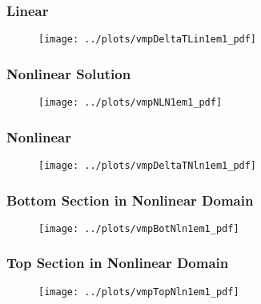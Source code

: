 \documentclass[compress,xcolor=table]{beamer}
\begin{document}
\begin{frame}
\frametitle{Linear \dtmax{}}

\begin{figure}[h!t]
\centering
\texttt{[image: ../plots/vmpDeltaTLin1em1\_pdf]}
\end{figure}

\end{frame}
\begin{frame}
\frametitle{Nonlinear Solution}

\begin{figure}[h!t]
\centering
\texttt{[image: ../plots/vmpNLN1em1\_pdf]}
\end{figure}

\end{frame}
\begin{frame}
\frametitle{Nonlinear \dtmax{}}

\begin{figure}[h!t]
\centering
\texttt{[image: ../plots/vmpDeltaTNln1em1\_pdf]}
\end{figure}

\end{frame}
\begin{frame}
\frametitle{Bottom Section in Nonlinear Domain}

\begin{figure}[h!t]
\centering
\texttt{[image: ../plots/vmpBotNln1em1\_pdf]}
\end{figure}

\end{frame}
\begin{frame}
\frametitle{Top Section in Nonlinear Domain}

\begin{figure}[h!t]
\centering
\texttt{[image: ../plots/vmpTopNln1em1\_pdf]}
\end{figure}

\end{frame}
\end{document}
